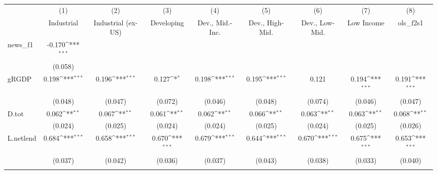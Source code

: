 {
\def\sym#1{\ifmmode^{#1}\else\(^{#1}\)\fi}
\begin{tabular}{l*{8}{c}}
\toprule
            &\multicolumn{1}{c}{(1)}&\multicolumn{1}{c}{(2)}&\multicolumn{1}{c}{(3)}&\multicolumn{1}{c}{(4)}&\multicolumn{1}{c}{(5)}&\multicolumn{1}{c}{(6)}&\multicolumn{1}{c}{(7)}&\multicolumn{1}{c}{(8)}\\
            &\multicolumn{1}{c}{Industrial}&\multicolumn{1}{c}{Industrial (ex-US)}&\multicolumn{1}{c}{Developing}&\multicolumn{1}{c}{Dev., Mid.-Inc.}&\multicolumn{1}{c}{Dev., High-Mid.}&\multicolumn{1}{c}{Dev., Low-Mid.}&\multicolumn{1}{c}{Low Income}&\multicolumn{1}{c}{ols\_f2s1}\\
\midrule
news\_f1     &      -0.170\sym{***}&                     &                     &                     &                     &                     &                     &                     \\
            &     (0.058)         &                     &                     &                     &                     &                     &                     &                     \\
\addlinespace
gRGDP       &       0.198\sym{***}&       0.196\sym{***}&       0.127\sym{*}  &       0.198\sym{***}&       0.195\sym{***}&       0.121         &       0.194\sym{***}&       0.191\sym{***}\\
            &     (0.048)         &     (0.047)         &     (0.072)         &     (0.046)         &     (0.048)         &     (0.074)         &     (0.046)         &     (0.047)         \\
\addlinespace
D.tot       &       0.062\sym{**} &       0.067\sym{**} &       0.061\sym{**} &       0.062\sym{**} &       0.066\sym{**} &       0.063\sym{**} &       0.063\sym{**} &       0.068\sym{**} \\
            &     (0.024)         &     (0.025)         &     (0.024)         &     (0.024)         &     (0.025)         &     (0.024)         &     (0.025)         &     (0.026)         \\
\addlinespace
L.netlend   &       0.684\sym{***}&       0.658\sym{***}&       0.670\sym{***}&       0.679\sym{***}&       0.644\sym{***}&       0.670\sym{***}&       0.675\sym{***}&       0.653\sym{***}\\
            &     (0.037)         &     (0.042)         &     (0.036)         &     (0.037)         &     (0.043)         &     (0.038)         &     (0.033)         &     (0.040)         \\
\addlinespace

\end{tabular}}
